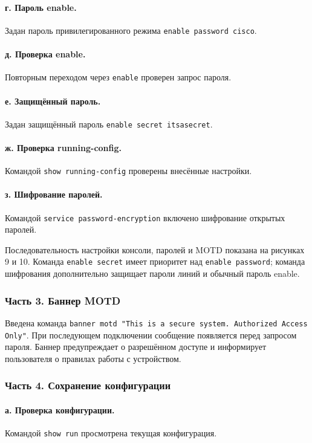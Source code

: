 \documentclass[a4paper,14pt,oneside]{extarticle}
\begin{document}
\paragraph{г. Пароль enable.}
Задан пароль привилегированного режима
\texttt{enable password cisco}.

\paragraph{д. Проверка enable.}
Повторным переходом через \texttt{enable} проверен запрос пароля.

\paragraph{е. Защищённый пароль.}
Задан защищённый пароль \texttt{enable secret itsasecret}.

\paragraph{ж. Проверка running-config.}
Командой \texttt{show running-config} проверены внесённые настройки.

\paragraph{з. Шифрование паролей.}
Командой \texttt{service password-encryption} включено шифрование
открытых паролей.

Последовательность настройки консоли, паролей и MOTD показана на рисунках 9
и 10. Команда \texttt{enable secret} имеет приоритет над
\texttt{enable password}; команда шифрования дополнительно защищает пароли
линий и обычный пароль enable.

\subsubsection{Часть 3. Баннер MOTD}

Введена команда \texttt{banner motd "This is a secure system. Authorized
Access Only"}. При последующем подключении сообщение появляется перед
запросом пароля. Баннер предупреждает о разрешённом доступе и информирует
пользователя о правилах работы с устройством.

\subsubsection{Часть 4. Сохранение конфигурации}

\paragraph{а. Проверка конфигурации.}
Командой \texttt{show run} просмотрена текущая конфигурация.
\end{document}
